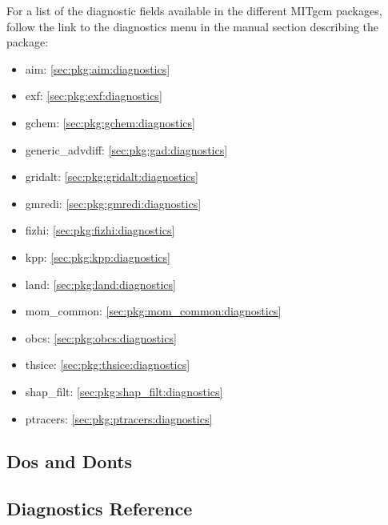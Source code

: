 

\newpage
\noindent For a list of the diagnostic fields available in the
different MITgcm packages, follow the link to the diagnostics menu
in the manual section describing the package:

\begin{itemize}
\item aim: \ref{sec:pkg:aim:diagnostics}
\item exf: \ref{sec:pkg:exf:diagnostics}
\item gchem: \ref{sec:pkg:gchem:diagnostics}
\item generic\_advdiff: \ref{sec:pkg:gad:diagnostics}
\item gridalt: \ref{sec:pkg:gridalt:diagnostics}
\item gmredi: \ref{sec:pkg:gmredi:diagnostics}
\item fizhi: \ref{sec:pkg:fizhi:diagnostics}
\item kpp: \ref{sec:pkg:kpp:diagnostics}
\item land: \ref{sec:pkg:land:diagnostics}
\item mom\_common: \ref{sec:pkg:mom_common:diagnostics}
\item obcs: \ref{sec:pkg:obcs:diagnostics}
\item thsice: \ref{sec:pkg:thsice:diagnostics}
\item shap\_filt: \ref{sec:pkg:shap_filt:diagnostics}
\item ptracers: \ref{sec:pkg:ptracers:diagnostics}
\end{itemize}

\subsection{Dos and Donts}

\subsection{Diagnostics Reference}


